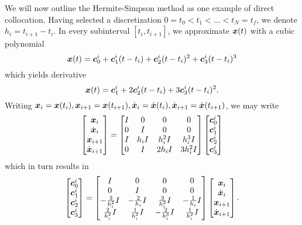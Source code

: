 We will now outline the Hermite-Simpson method as one example of direct collocation. Having selected a discretization $0 = t_0 < t_1 < \ldots < t_N = t_f$, we denote $h_i = t_{i+1} - t_i$. In every subinterval $[t_i, t_{i+1}]$, we approximate $\bm{x}(t)$ with a cubic polynomial
\begin{equation}
    \bm{x}(t) = \bm{c}_0^i + \bm{c}_1^i (t - t_i) + \bm{c}_2^i (t-t_i)^2 + \bm{c}_3^i (t - t_i)^3 
\end{equation}
which yields derivative 
\begin{equation}
    \bm{x}(t) = \bm{c}_1^i + 2 \bm{c}_2^i (t-t_i) + 3 \bm{c}_3^i (t - t_i)^2. 
\end{equation}
Writing $\bm{x}_i = \bm{x}(t_i), \bm{x}_{i+1} = \bm{x}(t_{i+1}), \dot{\bm{x}}_i = \dot{\bm{x}}(t_i), \dot{\bm{x}}_{i+1} = \dot{\bm{x}}(t_{i+1})$, we may write 
\begin{equation}
    \begin{bmatrix}
    \bm{x}_i\\
    \dot{\bm{x}}_{i}\\
    \bm{x}_{i+1}\\
    \dot{\bm{x}}_{i+1}
\end{bmatrix}
=
\begin{bmatrix}
I & 0 & 0 & 0\\
0 & I & 0 & 0\\
I & h_i I & h_i^2 I & h_i^3 I\\
0 &  I & 2 h_i I & 3 h_i^2 I
\end{bmatrix}
    \begin{bmatrix}
    \bm{c}_0^i\\
    \bm{c}_1^i\\
    \bm{c}_2^i\\
    \bm{c}_3^i
\end{bmatrix}
\end{equation}
which in turn results in 
\begin{equation}
\begin{bmatrix}
    \bm{c}_0^i\\
    \bm{c}_1^i\\
    \bm{c}_2^i\\
    \bm{c}_3^i
\end{bmatrix}
=
\begin{bmatrix}
I & 0 & 0 & 0\\
0 & I & 0 & 0\\
-\frac{3}{h_i^2} I & -\frac{2}{h_i} I & \frac{3}{h_i^2} I & -\frac{1}{h_i} I\\
\frac{2}{h_i^2} I & \frac{1}{h_i^2} I & -\frac{2}{h_i^3} I & \frac{1}{h_i^2} I
\end{bmatrix}
\begin{bmatrix}
    \bm{x}_i\\
    \dot{\bm{x}}_{i}\\
    \bm{x}_{i+1}\\
    \dot{\bm{x}}_{i+1}
\end{bmatrix}.
\end{equation}
